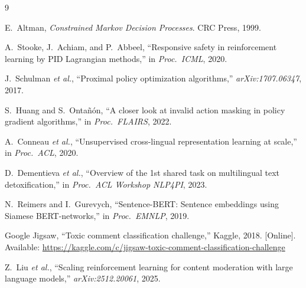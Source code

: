 \documentclass[journal]{IEEEtran}
\begin{document}
\begin{thebibliography}{9}

  E.~Altman, \textit{Constrained Markov Decision Processes}.
  CRC Press, 1999.

  A.~Stooke, J.~Achiam, and P.~Abbeel,
  ``Responsive safety in reinforcement learning by PID Lagrangian methods,''
  in \textit{Proc.\ ICML}, 2020.

  J.~Schulman \textit{et al.},
  ``Proximal policy optimization algorithms,''
  \textit{arXiv:1707.06347}, 2017.

  S.~Huang and S.~Onta\~n\'on,
  ``A closer look at invalid action masking in policy gradient algorithms,''
  in \textit{Proc.\ FLAIRS}, 2022.

  A.~Conneau \textit{et al.},
  ``Unsupervised cross-lingual representation learning at scale,''
  in \textit{Proc.\ ACL}, 2020.

  D.~Dementieva \textit{et al.},
  ``Overview of the 1st shared task on multilingual text detoxification,''
  in \textit{Proc.\ ACL Workshop NLP4PI}, 2023.

  N.~Reimers and I.~Gurevych,
  ``Sentence-BERT: Sentence embeddings using Siamese BERT-networks,''
  in \textit{Proc.\ EMNLP}, 2019.

  Google Jigsaw,
  ``Toxic comment classification challenge,'' Kaggle, 2018.
  [Online]. Available: \url{https://kaggle.com/c/jigsaw-toxic-comment-classification-challenge}

  Z.~Liu \textit{et al.},
  ``Scaling reinforcement learning for content moderation with large language models,''
  \textit{arXiv:2512.20061}, 2025.

\end{thebibliography}
\end{document}
